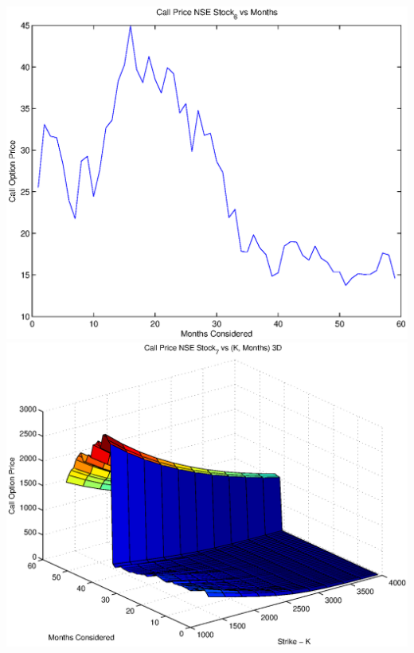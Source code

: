 \documentclass{article}
\begin{document}
\includegraphics[width=\textwidth]{Call_Price_NSE_Stock_6_vs_Months} \\

\includegraphics[width=\textwidth]{Call_Price_NSE_Stock_7_vs_(K,_Months)_3D} \\
\end{document}
